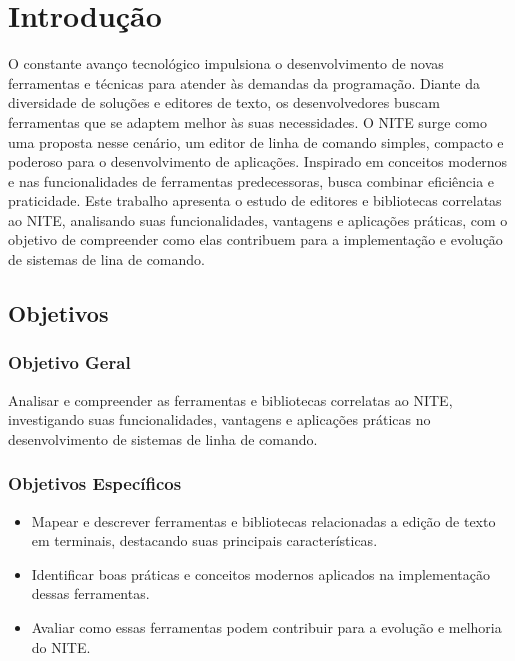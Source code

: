 \chapter{Introdução}
\label{cap:01}

O constante avanço tecnológico impulsiona o desenvolvimento de novas ferramentas e técnicas para atender às demandas da programação.
Diante da diversidade de soluções e editores de texto, os desenvolvedores buscam ferramentas que se adaptem melhor às suas necessidades.
O NITE surge como uma proposta nesse cenário, um editor de linha de comando simples, compacto e poderoso para o desenvolvimento de
aplicações. Inspirado em conceitos modernos e nas funcionalidades de ferramentas predecessoras, busca combinar eficiência e praticidade.
Este trabalho apresenta o estudo de editores e bibliotecas correlatas ao NITE, analisando suas funcionalidades, vantagens e aplicações
práticas, com o objetivo de compreender como elas contribuem para a implementação e evolução de sistemas de lina de comando.

\section{Objetivos}

\subsection{Objetivo Geral}

Analisar e compreender as ferramentas e bibliotecas correlatas ao NITE, investigando suas funcionalidades, vantagens e aplicações
práticas no desenvolvimento de sistemas de linha de comando.

\subsection{Objetivos Específicos}
\begin{itemize}
    \item Mapear e descrever ferramentas e bibliotecas relacionadas a edição de texto em terminais, destacando suas principais
    características.
    \item Identificar boas práticas e conceitos modernos aplicados na implementação dessas ferramentas.
    \item Avaliar como essas ferramentas podem contribuir para a evolução e melhoria do NITE.
\end{itemize}
